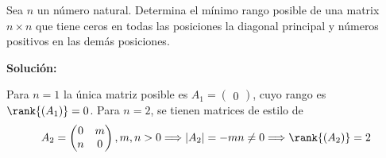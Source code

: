 \documentclass[../../main.tex]{subfiles}
\begin{document}
  \begin{shaded}
    Sea $n$ un número natural. Determina el mínimo rango posible de una matrix $n \times n$ que tiene ceros en todas las posiciones la diagonal principal y números positivos en las demás posiciones.
  \end{shaded}

  \textbf{Solución:}

  Para $n = 1$ la única matriz posible es $A_1 = \begin{pmatrix} 0 \end{pmatrix}$, cuyo rango es $\rank{(A_1)} = 0$. Para $n = 2$, se tienen matrices de estilo de
  $$
  A_2 = \begin{pmatrix} 0 & m \\ n & 0 \end{pmatrix}, m, n > 0 \Longrightarrow |A_2| = -m n \ne 0 \Longrightarrow \rank{(A_2)} = 2
  $$
\end{document}

